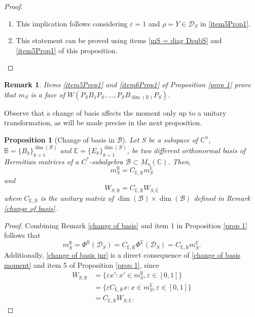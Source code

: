 \documentclass[12pt,a4paper]{article}
\def\calB{\mathcal B}
\def\calD{\mathcal D}
\def\C{\mathbb C}
\newtheorem{proposition}{Proposition}
\newtheorem{remark}{Remark}
\numberwithin{equation}{section}
\begin{document}
\begin{proof}
\begin{enumerate}
	
	\item[\ref{item5Prop1} $\Rightarrow$ \ref{item4Prop1}.] This implication follows considering $\varepsilon=1$ and $\rho=Y\in\calD_S$ in \ref{item5Prop1}.
	
	\item[\ref{item6Prop1}.] This statement can be proved using items \ref{mS = diag DsubS} and \ref{item5Prop1} of this proposition.
\end{enumerate}
\end{proof}

\begin{remark}
Items \ref{item5Prop1} and \ref{item6Prop1} of Proposition \ref{prop 1} prove that $m_S$ is a face of $W(P_SB_1P_S,\dots,P_SB_{{\dim(\mathbb{B})}}P_S)$.
\end{remark}

Observe that a change of basis affects the moment only up to a unitary transformation, as will be made precise in the next proposition.

\begin{proposition}[Change of basis in $\calB$] \label{propo: change of basis moment}
	Let $S$ be a subspace of $\C^n$, $\mathbb{B}=\{B_k\}_{k=1}^{\dim(\calB)}$ and $\mathbb{E}=\{E_k\}_{k=1}^{\dim(\calB)}$, be two different orthonormal basis of Hermitian matrices of a $C^*$-subalgebra $\calB\subset M_n(\C)$. Then,
	\begin{equation}\label{change of basis moment}
		m_S^{\mathbb{B}}= C_{\mathbb{E},\mathbb{B}}m_S^{\mathbb{E}}
	\end{equation}
	and
	\begin{equation}\label{change of basis jnr}
		W_{S,\mathbb{B}}=C_{\mathbb{E},\mathbb{B}}W_{S,\mathbb{E}}
	\end{equation}
	where $C_{\mathbb{E},\mathbb{B}}$ is the unitary matrix of $\dim(\calB)\times\dim(\calB)$ defined in Remark \ref{change of basis}. 
\end{proposition}
\begin{proof}
	Combining Remark \ref{change of basis} and item 1 in Proposition \ref{prop 1}  follows that $$m_S^{\mathbb{B}}=\Phi^{\mathbb{B}}(\calD_S)= C_{\mathbb{E},\mathbb{B}}\Phi^{\mathbb{E}}(\calD_S)=C_{\mathbb{E},\mathbb{B}}m_S^{\mathbb{E}}.$$
	Additionally, \eqref{change of basis jnr} is a direct consequence of \eqref{change of basis moment} and item 5 of Proposition \ref{prop 1}, since
	\begin{align*}
		W_{S,\mathbb{B}}&= \{\varepsilon x': x'\in m_S^{\mathbb{B}}, \varepsilon\in[0,1]\}\\
		&= \{\varepsilon C_{\mathbb{E},\mathbb{B}}x: x\in m_S^{\mathbb{E}}, \varepsilon\in[0,1]\}\\
		&= C_{\mathbb{E},\mathbb{B}}W_{S,\mathbb{E}}.
	\end{align*}	
\end{proof}
 
\end{document}
